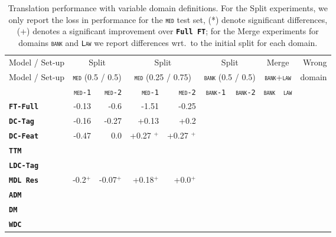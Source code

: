 \documentclass[11pt]{article}
\newcommand{\fyTodo}[1]{\Todo[FY:]{\textcolor{orange}{#1}}}
\newcommand{\domain}[1]{\texttt{\textsc{#1}}}
\newcommand{\system}[1]{\texttt{\textbf{#1}}}
\begin{document}
\begin{table}
  \centering
  \begin{tabular}{|p{2.5cm}|*{9}{r|}} \hline
    Model / Set-up & \multicolumn{2}{c|}{Split} &  \multicolumn{2}{c|}{Split} & \multicolumn{2}{c|}{Split} & \multicolumn{2}{c|}{Merge} & Wrong \\ %
     Model / Set-up & \multicolumn{2}{c|}{\domain{med} \footnotesize{(0.5 / 0.5)}} &  \multicolumn{2}{c|}{\domain{med} {\footnotesize (0.25 / 0.75)}} & \multicolumn{2}{c|}{\domain{bank} {\footnotesize (0.5 / 0.5)}} & \multicolumn{2}{c|}{\domain{bank}+\domain{law}} & domain \\ \hline
    & \domain{med-1} & \domain{med-2} & \domain{med-1} & \domain{med-2} &  \domain{bank-1} & \domain{bank-2} & \domain{bank} & \domain{law} & \\
    \system{FT-Full}       & -0.13 & -0.6 & -1.51& -0.25& & & & & \\
    \system{DC-Tag}      & -0.16 & -0.27& +0.13& +0.2& & & & & \\
    \system{DC-Feat}     & -0.47& 0.0 & +0.27 $^+$ & +0.27 $^+$& & & & & \\
    \system{TTM}           & & & & & & & & &  \\
    \system{LDC-Tag}    & & & & & & & & & \\ 

    \system{MDL Res}    & -0.2$^+$& -0.07$^+$&+0.18$^+$  &+0.0$^+$ & & & & & \\

    \system{ADM} & & & & & & & & & \\
    \system{DM}    & & & & & & & & & \\
    \system{WDC}  & & & & & & & & & \\
    \hline
  \end{tabular}
  \caption{Translation performance with variable domain definitions. For the Split experiments, we only report the loss in performance for the \domain{med} test set, (*) denote significant differences, (+) denotes a significant improvement over \system{Full FT}; for the Merge experiments for domains \domain{bank} and \domain{Law} we report differences wrt.\ to the initial split for each domain.\fyTodo{How about wrong ?}}
  \label{tab:performance}
\end{table}
\end{document}
